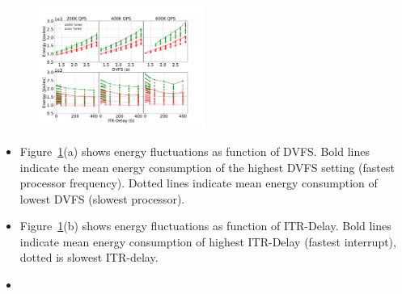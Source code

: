 \begin{figure}
\centering
\includegraphics[width=0.5\textwidth]{figures/mcd_detail_1}
\caption[]{}
\label{fig:mcd_detail_1}
\end{figure}

\begin{figure}
  \centering
   \hfill
\end{figure}
    

\begin{itemize}
    \item Figure~\ref{fig:mcd_detail_1}(a) shows energy fluctuations as function of DVFS. Bold lines indicate the mean energy consumption of the highest DVFS setting (fastest processor frequency). Dotted lines indicate mean energy consumption of lowest DVFS (slowest processor).
    \item Figure~\ref{fig:mcd_detail_1}(b)  shows energy fluctuations as function of ITR-Delay. Bold lines indicate mean energy consumption of highest ITR-Delay (fastest interrupt), dotted is slowest ITR-delay.
    \item 
\end{itemize}